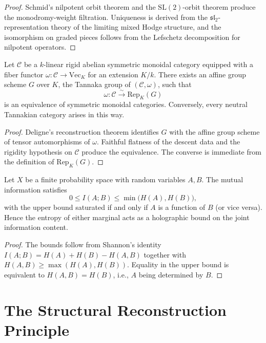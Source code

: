 \begin{proof}
Schmid's nilpotent orbit theorem and the $\mathrm{SL}(2)$-orbit theorem produce the monodromy-weight filtration. Uniqueness is derived from the $\mathfrak{sl}_2$-representation theory of the limiting mixed Hodge structure, and the isomorphism on graded pieces follows from the Lefschetz decomposition for nilpotent operators.
\end{proof}

\begin{theorem}\label{thm-tannakian}
Let $\mathcal C$ be a $k$-linear rigid abelian symmetric monoidal category equipped with a fiber functor $\omega : \mathcal C \to \mathrm{Vec}_K$ for an extension $K/k$. There exists an affine group scheme $G$ over $K$, the Tannaka group of $(\mathcal C, \omega)$, such that
\[
\omega : \mathcal C \xrightarrow{\sim} \mathrm{Rep}_K(G)
\]
is an equivalence of symmetric monoidal categories. Conversely, every neutral Tannakian category arises in this way.
\end{theorem}

\begin{proof}
Deligne's reconstruction theorem identifies $G$ with the affine group scheme of tensor automorphisms of $\omega$. Faithful flatness of the descent data and the rigidity hypothesis on $\mathcal C$ produce the equivalence. The converse is immediate from the definition of $\mathrm{Rep}_K(G)$.
\end{proof}

\begin{theorem}\label{thm-holographic-entropy}
Let $X$ be a finite probability space with random variables $A,B$. The mutual information satisfies
\[
0 \le I(A;B) \le \min\bigl(H(A), H(B)\bigr),
\]
with the upper bound saturated if and only if $A$ is a function of $B$ (or vice versa). Hence the entropy of either marginal acts as a holographic bound on the joint information content.
\end{theorem}

\begin{proof}
The bounds follow from Shannon's identity $I(A;B) = H(A) + H(B) - H(A,B)$ together with $H(A,B) \ge \max(H(A), H(B))$. Equality in the upper bound is equivalent to $H(A,B) = H(B)$, i.e., $A$ being determined by $B$.
\end{proof}

\section{The Structural Reconstruction Principle}

